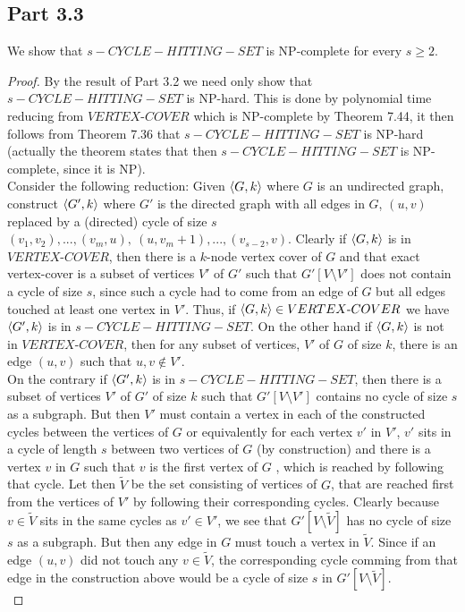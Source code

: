 \documentclass[a4paper,11pt]{article}
\newcommand{\tm}{\text{-}}
\numberwithin{equation}{section}
\begin{document}
	\subsection*{Part 3.3}
	We show that $ s-C Y C L E-H I T T I N G-S E T $ is NP-complete for every $ s\geq 2 $.
	\begin{proof}
		By the result of Part 3.2 we need only show that $ s-C Y C L E-H I T T I N G-S E T $ is NP-hard. This is done by polynomial time reducing from $ VERTEX\tm COVER $ which is NP-complete by Theorem 7.44, it then follows from Theorem 7.36 that $ s-C Y C L E-H I T T I N G-S E T $ is NP-hard (actually the theorem states that then $ s-C Y C L E-H I T T I N G-S E T $ is NP-complete, since it is NP).\\
		Consider the following reduction: Given $ \braket{G,k} $ where $ G $ is an undirected graph, construct $ \braket{G',k} $ where $ G' $ is the directed graph with all edges in $ G $, $ (u,v) $ replaced by a (directed) cycle of size $ s $ $ (v_1,v_2),...,(v_m,u),\ (u,v_m+1),...,(v_{s-2},v) $. Clearly if $ \braket{G,k} $ is in $ VERTEX\tm COVER $, then there is a $ k $-node vertex cover of $ G $ and that exact vertex-cover is a subset of vertices $ V' $ of $ G' $ such that $ G'[V\setminus V'] $ does not contain a cycle of size $ s $, since such a cycle had to come from an edge of $ G $ but all edges touched at least one vertex in $ V' $. Thus, if $ \braket{G,k}\in VERTEX\tm COVER $ we have $ \braket{G',k} $ is in $ s-C Y C L E-H I T T I N G-S E T  $. On the other hand if $ \braket{G,k} $ is not in $ VERTEX\tm COVER $, then for any subset of vertices, $ V' $ of $ G $ of size $ k $, there is an edge $ (u,v) $ such that $ u,v\notin V' $. \\
		On the contrary if $ \braket{G',k} $ is in $ s-C Y C L E-H I T T I N G-S E T $, then there is a subset of vertices $ V' $ of $ G' $ of size $ k $ such that $ G'[V\setminus V'] $ contains no cycle of size $ s $ as a subgraph. But then $ V' $ must contain a vertex in each of the constructed cycles between the vertices of $ G $ or equivalently for each vertex $ v' $ in $ V' $, $ v' $ sits in a cycle of length $ s $ between two vertices of $ G $ (by construction) and there is a vertex $ v $ in $ G $ such that $ v $ is the first vertex of $ G $ , which is reached by following that cycle. Let then $ \tilde{V} $ be the set consisting of vertices of $ G $, that are reached first from the vertices of $ V' $ by following their corresponding cycles. Clearly because $ v\in \tilde{V} $ sits in the same cycles as $ v'\in V' $, we see that $ G'[V\setminus\tilde{V}] $ has no cycle of size $ s $ as a subgraph. But then any edge in $ G $ must touch a vertex in $ \tilde{V} $. Since if an edge $ (u,v) $ did not touch any $ v\in\tilde{V} $, the corresponding cycle comming from that edge in the construction above would be a cycle of size $ s $ in $ G'[V\setminus \tilde{V}] $.\\

\end{proof}
\end{document}
